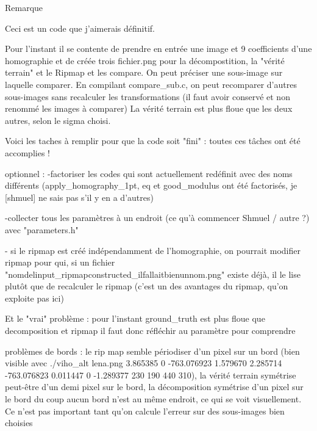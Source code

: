 Remarque

Ceci est un code que j’aimerais définitif.

Pour l'instant il se contente de prendre en entrée une image et 9 coefficients d'une homographie et de créée trois fichier.png pour la décompostition, la "vérité terrain" et le Ripmap et les compare. On peut préciser une sous-image sur laquelle comparer.
En compilant compare_sub.c, on peut recomparer d'autres sous-images sans recalculer les transformations (il faut avoir conservé et non renommé les images à comparer)
La vérité terrain est plus floue que les deux autres, selon le sigma choisi.



Voici les taches à remplir pour que la code soit "fini" :
	toutes ces tâches ont été accomplies !
	
	
	
optionnel :
	-factoriser les codes qui sont actuellement redéfinit avec des noms différents (apply_homography_1pt, eq et good_modulus ont été factorisés, je [shmuel] ne sais pas s'il y en a d'autres) 
	
	-collecter tous les paramètres à un endroit (ce qu'à commencer Shmuel / autre ?) avec "parameters.h"
	
	- si le ripmap est créé indépendamment de l'homographie, on pourrait modifier ripmap pour qui, si un fichier "nomdelinput_ripmapconstructed_ilfallaitbienunnom.png" existe déjà, il le lise plutôt que de recalculer le ripmap (c'est un des avantages du ripmap, qu'on exploite pas ici)
	
	
	
Et le "vrai" problème :
	pour l'instant ground_truth est plus floue que decomposition et ripmap
	il faut donc réfléchir au paramètre pour comprendre

problèmes de bords :
	le rip map semble périodiser d'un pixel sur un bord (bien visible avec ./viho_alt lena.png 3.865385 0 -763.076923 1.579670 2.285714 -763.076823 0.011447 0 -1.289377 230 190 440 310), la vérité terrain symétrise peut-être d'un demi pixel sur le bord, la décomposition symétrise d'un pixel sur le bord
	du coup aucun bord n'est au même endroit, ce qui se voit visuellement. Ce n'est pas important tant qu'on calcule l'erreur sur des sous-images bien choisies
